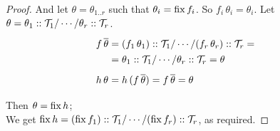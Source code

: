 \begin{proof}
And let $\theta=\theta_{1..r}$ such that $\theta_i=\operatorname{fix} f_i$. So $f_i\,\theta_i=\theta_i$.
Let $\theta=\theta_1::\mathcal{T}_1/\cdots/\theta_r::\mathcal{T}_r$.
\[\renewcommand\arraystretch{1.3}
  \begin{array}{l@{}l}
   f\,\overline\theta & {}= (f_1\,\theta_1)::\T_1 / \cdots / (f_r\,\theta_r)::\T_r =  \\
     & {}= \theta_1::\T_1 / \cdots / \theta_r::\T_r = \theta \\[.5em]
   h\,\theta & {}= h\,(f\,\overline\theta) = f\,\overline\theta = \theta
   \end{array}\qquad\]
   
Then $\theta=\operatorname{fix} h$;\\
We get $\operatorname{fix} h = (\operatorname{fix} f_1)::\mathcal{T}_1 / \cdots / (\operatorname{fix} f_r)::\mathcal{T}_r$,
as required.
\end{proof}
